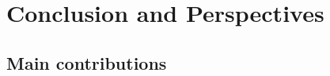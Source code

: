 
\chapter{Conclusion and Perspectives}\label{chap:conclusion}








\section{Main contributions}






